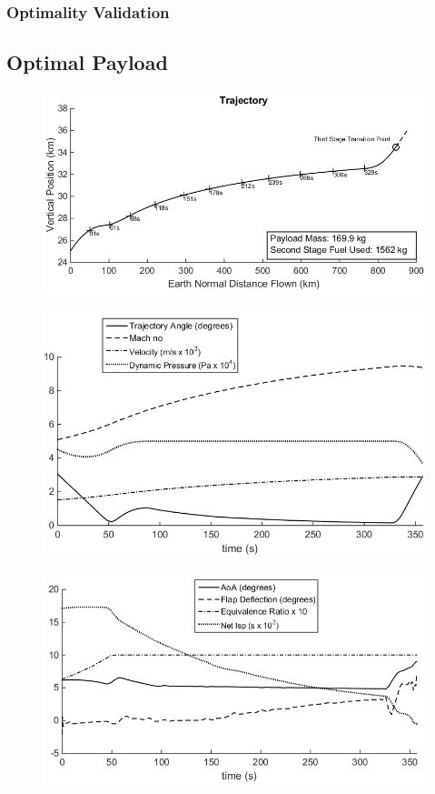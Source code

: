\subsubsection{Optimality Validation}


\subsection{Optimal Payload}
\begin{figure}
\centering
\includegraphics[width=0.9\linewidth]{figures/5_Ascent/qlimited50kpa}
\caption{}
\label{fig:qlimited50kpa}
\end{figure}
\begin{figure}
\centering
\includegraphics[width=0.8\linewidth]{figures/5_Ascent/qlimited50kpa-Aero}
\caption{}
\label{fig:qlimited50kpa-Aero}
\end{figure}
\begin{figure}
\centering
\includegraphics[width=0.8\linewidth]{figures/5_Ascent/qlimited-Vehicle}
\caption{}
\label{fig:qlimited-Vehicle}
\end{figure}

